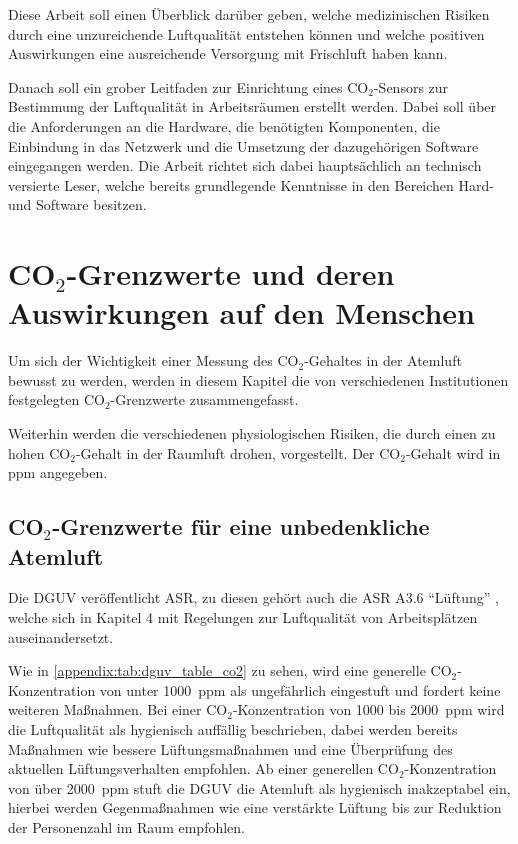 \documentclass[a4paper,
    11pt,
    headings=small,
    ngerman,
    listof=totoc,
    numbers=noenddot]{scrreprt}[2021/11/13]
\begin{document}
Diese Arbeit soll einen Überblick darüber geben, welche medizinischen Risiken durch eine unzureichende Luftqualität entstehen können und welche positiven Auswirkungen eine ausreichende Versorgung mit Frischluft haben kann.

Danach soll ein grober Leitfaden zur Einrichtung eines CO$_2$-Sensors zur Bestimmung der Luftqualität in Arbeitsräumen erstellt werden. Dabei soll über die Anforderungen an die Hardware, die benötigten Komponenten, die Einbindung in das Netzwerk und die Umsetzung der dazugehörigen Software eingegangen werden. Die Arbeit richtet sich dabei hauptsächlich an technisch versierte Leser, welche bereits grundlegende Kenntnisse in den Bereichen Hard- und Software besitzen.


\chapter{CO\texorpdfstring{$_2$}{TEXT}-Grenzwerte und deren Auswirkungen auf den Menschen}

Um sich der Wichtigkeit einer Messung des CO$_2$-Gehaltes in der Atemluft bewusst zu werden, werden in diesem Kapitel die von verschiedenen Institutionen festgelegten CO$_2$-Grenzwerte zusammengefasst.

Weiterhin werden die verschiedenen physiologischen Risiken, die durch einen zu hohen CO$_2$-Gehalt in der Raumluft drohen, vorgestellt. Der CO$_2$-Gehalt wird in \ac{ppm} angegeben.


\section{CO\texorpdfstring{$_2$}{TEXT}-Grenzwerte für eine unbedenkliche Atemluft}

Die \ac{DGUV} veröffentlicht \ac{ASR}, zu diesen gehört auch die \ac{ASR} A3.6 \enquote{Lüftung} \autocite{ASR}, welche sich in Kapitel 4 mit Regelungen zur Luftqualität von Arbeitsplätzen auseinandersetzt.

Wie in \vref{appendix:tab:dguv_table_co2} zu sehen, wird eine generelle CO$_2$-Konzentration von unter \SI{1000}{\ac{ppm}} als ungefährlich eingestuft und fordert keine weiteren Maßnahmen. Bei einer CO$_2$-Konzentration von \si{1000} bis \SI{2000}{\ac{ppm}} wird die Luftqualität als hygienisch auffällig beschrieben, dabei werden bereits Maßnahmen wie bessere Lüftungsmaßnahmen und eine Überprüfung des aktuellen Lüftungsverhalten empfohlen. Ab einer generellen CO$_2$-Konzentration von über \SI{2000}{\ac{ppm}} stuft die \ac{DGUV} die Atemluft als hygienisch inakzeptabel ein, hierbei werden
Gegenmaßnahmen wie eine verstärkte Lüftung bis zur Reduktion der Personenzahl im Raum empfohlen.
\end{document}

